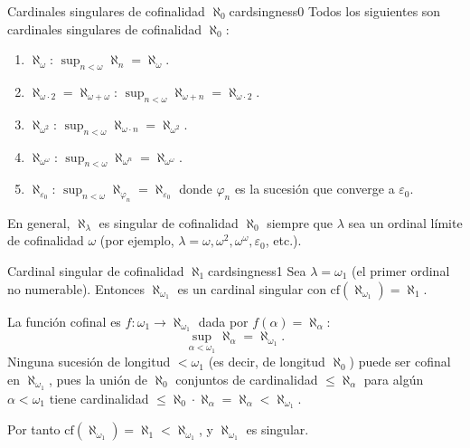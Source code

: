 \begin{ejemplo}{Cardinales singulares de cofinalidad $\aleph_0$}{cardsingness0}
Todos los siguientes son cardinales singulares de cofinalidad $\aleph_0$:
\begin{enumerate}[leftmargin=2em, label=(\alph*)]
  \item $\aleph_\omega$: $\sup_{n<\omega} \aleph_n = \aleph_\omega$.
  \item $\aleph_{\omega \cdot 2} = \aleph_{\omega + \omega}$: $\sup_{n<\omega} \aleph_{\omega + n} = \aleph_{\omega \cdot 2}$.
  \item $\aleph_{\omega^2}$: $\sup_{n<\omega} \aleph_{\omega \cdot n} = \aleph_{\omega^2}$.
  \item $\aleph_{\omega^\omega}$: $\sup_{n<\omega} \aleph_{\omega^n} = \aleph_{\omega^\omega}$.
  \item $\aleph_{\varepsilon_0}$: $\sup_{n<\omega} \aleph_{\varphi_n} = \aleph_{\varepsilon_0}$ donde $\varphi_n$ es la sucesión que converge a $\varepsilon_0$.
\end{enumerate}
En general, $\aleph_\lambda$ es singular de cofinalidad $\aleph_0$ siempre que $\lambda$ sea un ordinal límite de cofinalidad $\omega$ (por ejemplo, $\lambda = \omega, \omega^2, \omega^\omega, \varepsilon_0$, etc.).
\end{ejemplo}

\begin{ejemplo}{Cardinal singular de cofinalidad $\aleph_1$}{cardsingness1}
Sea $\lambda = \omega_1$ (el primer ordinal no numerable). Entonces $\aleph_{\omega_1}$ es un cardinal singular con $\mathrm{cf}(\aleph_{\omega_1}) = \aleph_1$.

La función cofinal es $f \colon \omega_1 \to \aleph_{\omega_1}$ dada por $f(\alpha) = \aleph_\alpha$:
\[
  \sup_{\alpha < \omega_1} \aleph_\alpha = \aleph_{\omega_1}.
\]
Ninguna sucesión de longitud $< \omega_1$ (es decir, de longitud $\aleph_0$) puede ser cofinal en $\aleph_{\omega_1}$, pues la unión de $\aleph_0$ conjuntos de cardinalidad $\leq \aleph_\alpha$ para algún $\alpha < \omega_1$ tiene cardinalidad $\leq \aleph_0 \cdot \aleph_\alpha = \aleph_\alpha < \aleph_{\omega_1}$.

Por tanto $\mathrm{cf}(\aleph_{\omega_1}) = \aleph_1 < \aleph_{\omega_1}$, y $\aleph_{\omega_1}$ es singular.
\end{ejemplo}

